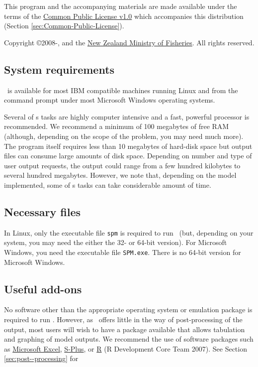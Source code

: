 This program and the accompanying materials are made available under the terms of the \href{http://www.opensource.org/licenses/cpl1.0.php}{Common Public License v1.0} which accompanies this distribution (Section \ref{sec:Common-Public-License}).

Copyright \copyright 2008-\SourceControlYearSPM, \href{http://www.niwa.co.nz}{\Organisation} and the \href{http://www.fish.govt.nz}{New Zealand Ministry of Fisheries}. All rights reserved. 

\subsection{System requirements}

\SPM\ is available for most IBM compatible machines running Linux and from the command prompt under most Microsoft Windows operating systems. 

Several of \SPM s tasks are highly computer intensive and a fast, powerful processor is recommended. We recommend a minimum of 100 megabytes of free RAM (although, depending on the scope of the problem, you may need much more). The program itself requires less than 10 megabytes of hard-disk space but output files can consume large amounts of disk space. Depending on number and type of user output requests, the output could range from a few hundred kilobytes to several hundred megabytes. However, we note that, depending on the model implemented, some of \SPM s tasks can take considerable amount of time.

\subsection{Necessary files}

In Linux, only the executable file \texttt{spm} is required to run \SPM\ (but, depending on your system, you may need the either the 32- or 64-bit version). For Microsoft Windows, you need the executable file \texttt{SPM.exe}. There is no 64-bit version for Microsoft Windows.

\subsection{Useful add-ons}

No software other than the appropriate operating system or emulation package is required to run \SPM. However, as \SPM\ offers little in the way of  post-processing of the output, most users will wish to have a package available that allows tabulation and graphing of model outputs. We recommend the use of software packages such as \href{http://www.microsoft.com}{Microsoft Excel}, \href{http://www.insightful.com}{S-Plus}, or \href{http://www.r-project.org}{R} (R Development Core Team 2007). See Section \ref{sec:post--processing} for 

